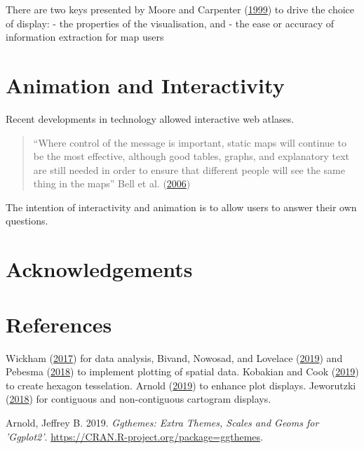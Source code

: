 \documentclass[11pt,]{article}
\begin{document}
There are two keys presented by Moore and Carpenter
(\protect\hyperlink{ref-SAMGIS}{1999}) to drive the choice of display: -
the properties of the visualisation, and - the ease or accuracy of
information extraction for map users

\hypertarget{animation-and-interactivity}{%
\section{Animation and
Interactivity}\label{animation-and-interactivity}}

Recent developments in technology allowed interactive web atlases.

\begin{quote}
``Where control of the message is important, static maps will continue
to be the most effective, although good tables, graphs, and explanatory
text are still needed in order to ensure that different people will see
the same thing in the maps'' Bell et al.
(\protect\hyperlink{ref-CPISACA}{2006})
\end{quote}

The intention of interactivity and animation is to allow users to answer
their own questions.

\hypertarget{acknowledgements}{%
\section{Acknowledgements}\label{acknowledgements}}

\hypertarget{references}{%
\section{References}\label{references}}

Wickham (\protect\hyperlink{ref-tidyerse}{2017}) for data analysis,
Bivand, Nowosad, and Lovelace (\protect\hyperlink{ref-spData}{2019}) and
Pebesma (\protect\hyperlink{ref-sf}{2018}) to implement plotting of
spatial data. Kobakian and Cook (\protect\hyperlink{ref-sugarbag}{2019})
to create hexagon tesselation. Arnold
(\protect\hyperlink{ref-ggthemes}{2019}) to enhance plot displays.
Jeworutzki (\protect\hyperlink{ref-cartogram}{2018}) for contiguous and
non-contiguous cartogram displays.

\hypertarget{refs}{}
\leavevmode\hypertarget{ref-ggthemes}{}%
Arnold, Jeffrey B. 2019. \emph{Ggthemes: Extra Themes, Scales and Geoms
for 'Ggplot2'}. \url{https://CRAN.R-project.org/package=ggthemes}.
\end{document}
